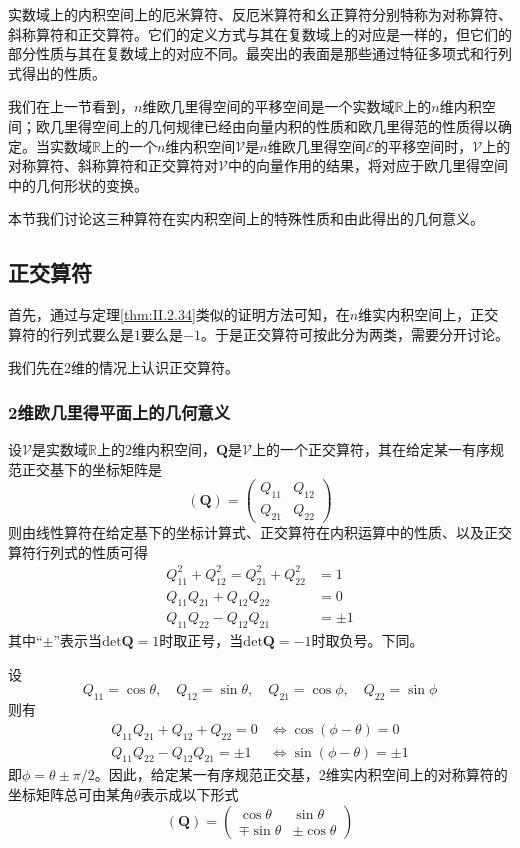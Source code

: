 \documentclass[main.tex]{subfiles}
\begin{document}
实数域上的内积空间上的厄米算符、反厄米算符和幺正算符分别特称为对称算符、斜称算符和正交算符。它们的定义方式与其在复数域上的对应是一样的，但它们的部分性质与其在复数域上的对应不同。最突出的表面是那些通过特征多项式和行列式得出的性质。

我们在上一节看到，$n$维欧几里得空间的平移空间是一个实数域$\mathbb{R}$上的$n$维内积空间；欧几里得空间上的几何规律已经由向量内积的性质和欧几里得范的性质得以确定。当实数域$\mathbb{R}$上的一个$n$维内积空间$\mathcal{V}$是$n$维欧几里得空间$\mathcal{E}$的平移空间时，$\mathcal{V}$上的对称算符、斜称算符和正交算符对$\mathcal{V}$中的向量作用的结果，将对应于欧几里得空间中的几何形状的变换。

本节我们讨论这三种算符在实内积空间上的特殊性质和由此得出的几何意义。

\subsection{正交算符}\label{sec:II.3.3.1}
首先，通过与定理\ref{thm:II.2.34}类似的证明方法可知，在$n$维实内积空间上，正交算符的行列式要么是$1$要么是$-1$。于是正交算符可按此分为两类，需要分开讨论。

我们先在2维的情况上认识正交算符。

\subsubsection{2维欧几里得平面上的几何意义}
设$\mathcal{V}$是实数域$\mathbb{R}$上的2维内积空间，$\mathbf{Q}$是$\mathcal{V}$上的一个正交算符，其在给定某一有序规范正交基下的坐标矩阵是
\[\left(\mathbf{Q}\right)=\left(\begin{array}{cc}Q_{11}&Q_{12}\\Q_{21}&Q_{22}\end{array}\right)\]
则由线性算符在给定基下的坐标计算式、正交算符在内积运算中的性质、以及正交算符行列式的性质可得
\begin{align*}
    Q_{11}^2+Q_{12}^2=Q_{21}^2+Q_{22}^2 & =1     \\
    Q_{11}Q_{21}+Q_{12}Q_{22}           & =0     \\
    Q_{11}Q_{22}-Q_{12}Q_{21}           & =\pm 1
\end{align*}
其中“$\pm$”表示当$\mathrm{det}\mathbf{Q}=1$时取正号，当$\mathrm{det}\mathbf{Q}=-1$时取负号。下同。

设
\[Q_{11}=\cos\theta,\quad Q_{12}=\sin\theta,\quad Q_{21}=\cos\phi,\quad Q_{22}=\sin\phi\]
则有
\begin{align*}
    Q_{11}Q_{21}+Q_{12}+Q_{22}  =0    & \Leftrightarrow\cos\left(\phi-\theta\right)=0     \\
    Q_{11}Q_{22}-Q_{12}Q_{21}  =\pm 1 & \Leftrightarrow\sin\left(\phi-\theta\right)=\pm 1
\end{align*}
即$\phi=\theta\pm\pi/2$。因此，给定某一有序规范正交基，2维实内积空间上的对称算符的坐标矩阵总可由某角$\theta$表示成以下形式
\[\left(\mathbf{Q}\right)=\left(\begin{array}{cc}\cos\theta&\sin\theta\\\mp\sin\theta&\pm\cos\theta\end{array}\right)\]
\end{document}
